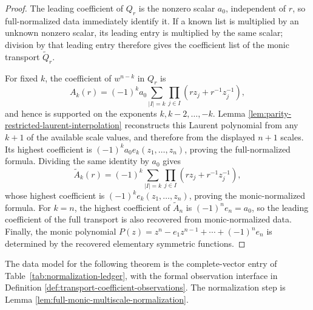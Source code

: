\begin{proof}
The leading coefficient of \(Q_r\) is the nonzero scalar \(a_0\), independent of \(r\), so full-normalized data immediately identify it.  If a known list is multiplied by an unknown nonzero scalar, its leading entry is multiplied by the same scalar; division by that leading entry therefore gives the coefficient list of the monic transport \(\widetilde Q_r\).

For fixed \(k\), the coefficient of \(w^{n-k}\) in \(Q_r\) is
\[
A_k(r)=(-1)^k a_0\sum_{|I|=k}\prod_{j\in I}(rz_j+r^{-1}z_j^{-1}),
\]
and hence is supported on the exponents \(k,k-2,
\dots,-k\).  Lemma \ref{lem:parity-restricted-laurent-interpolation} reconstructs this Laurent polynomial from any \(k+1\) of the available scale values, and therefore from the displayed \(n+1\) scales.  Its highest coefficient is \((-1)^ka_0e_k(z_1,
\dots,z_n)\), proving the full-normalized formula.  Dividing the same identity by \(a_0\) gives
\[
\widetilde A_k(r)=(-1)^k\sum_{|I|=k}\prod_{j\in I}(rz_j+r^{-1}z_j^{-1}),
\]
whose highest coefficient is \((-1)^ke_k(z_1,
\dots,z_n)\), proving the monic-normalized formula.  For \(k=n\), the highest coefficient of \(\widetilde A_n\) is \((-1)^ne_n=a_0\), so the leading coefficient of the full transport is also recovered from monic-normalized data.  Finally, the monic polynomial \(P(z)=z^n-e_1z^{n-1}+\cdots+(-1)^ne_n\) is determined by the recovered elementary symmetric functions.
\end{proof}

The data model for the following theorem is the complete-vector entry of
Table~\ref{tab:normalization-ledger}, with the formal observation
interface in Definition \ref{def:transport-coefficient-observations}.
The normalization step is Lemma
\ref{lem:full-monic-multiscale-normalization}.

